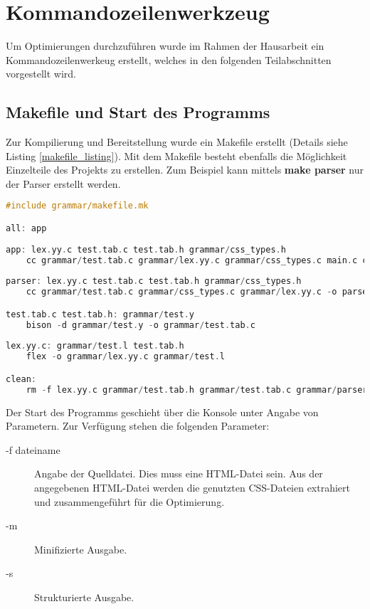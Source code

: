 \section{Kommandozeilenwerkzeug}
Um Optimierungen durchzuführen wurde im Rahmen der Hausarbeit ein Kommandozeilenwerkeug erstellt, welches in den folgenden Teilabschnitten vorgestellt wird.

\subsection{Makefile und Start des Programms}
Zur Kompilierung und Bereitstellung wurde ein Makefile erstellt (Details siehe Listing \ref{makefile_listing}). Mit dem Makefile besteht ebenfalls die Möglichkeit Einzelteile des Projekts zu erstellen. Zum Beispiel kann mittels \textbf{make parser} nur der Parser erstellt werden.

\begin{lstlisting}[label=makefile_listing,language=C, caption=Makefile]
#include grammar/makefile.mk

all: app
	
app: lex.yy.c test.tab.c test.tab.h grammar/css_types.h
	cc grammar/test.tab.c grammar/lex.yy.c grammar/css_types.c main.c cli_parse.c css_merge.c guiCSS.c optimizer.c output.c -lncurses -o optimCSS
	
parser: lex.yy.c test.tab.c test.tab.h grammar/css_types.h
	cc grammar/test.tab.c grammar/css_types.c grammar/lex.yy.c -o parser

test.tab.c test.tab.h: grammar/test.y
	bison -d grammar/test.y -o grammar/test.tab.c
            
lex.yy.c: grammar/test.l test.tab.h
	flex -o grammar/lex.yy.c grammar/test.l

clean: 
	rm -f lex.yy.c grammar/test.tab.h grammar/test.tab.c grammar/parser optimCSS
\end{lstlisting}

Der Start des Programms geschieht über die Konsole unter Angabe von Parametern. Zur Verfügung stehen die folgenden Parameter:

\begin{description}
   \item[ -f dateiname] Angabe der Quelldatei. Dies muss eine HTML-Datei sein. Aus der angegebenen HTML-Datei werden die genutzten CSS-Dateien extrahiert und zusammengeführt für die Optimierung.
   \item[ -m] Minifizierte Ausgabe.
   \item[ -s] Strukturierte Ausgabe.
\end{description}


